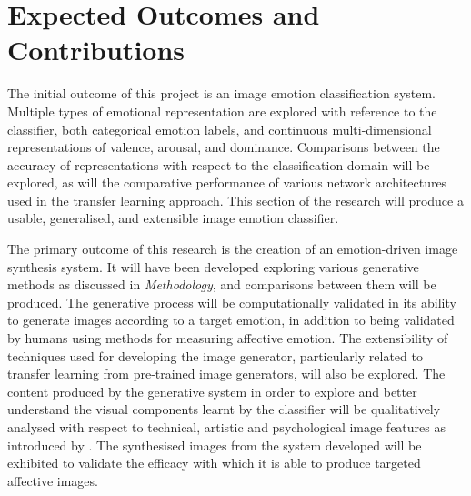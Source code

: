 \documentclass{article}
\begin{document}
\section{Expected Outcomes and Contributions}

The initial outcome of this project is an image emotion classification system.
Multiple types of emotional representation are explored with reference to the classifier, both categorical emotion labels, and continuous multi-dimensional representations of valence, arousal, and dominance.
Comparisons between the accuracy of representations with respect to the classification domain will be explored, as will the comparative performance of various network architectures used in the transfer learning approach.
This section of the research will produce a usable, generalised, and extensible image emotion classifier.

The primary outcome of this research is the creation of an emotion-driven image synthesis system.
It will have been developed exploring various generative methods as discussed in \textit{Methodology}, and comparisons between them will be produced.
The generative process will be computationally validated in its ability to generate images according to a target emotion, in addition to being validated by humans using methods for measuring affective emotion.
The extensibility of techniques used for developing the image generator, particularly related to transfer learning from pre-trained image generators, will also be explored.
The content produced by the generative system in order to explore and better understand the visual components learnt by the classifier will be qualitatively analysed with respect to technical, artistic and psychological image features as introduced by \citet{machajdik2010affective}.
The synthesised images from the system developed will be exhibited to validate the efficacy with which it is able to produce targeted affective images.



\end{document}
